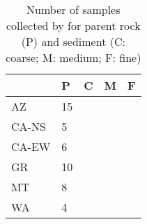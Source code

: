 \begin{table}[t]
    \centering
    \caption{Number of samples collected by \Textcite{Heins_1992} for parent rock (P) and sediment (C: coarse; M: medium; F: fine)}
    \label{tab:n_samples_Heins}
    \begin{threeparttable}
        \begin{tabular}{lllll}
            \toprule
                  & P  & C & M & F \\
            \midrule
            AZ    & 15 &   &   &   \\
            CA-NS & 5  &   &   &   \\
            CA-EW & 6  &   &   &   \\
            GR    & 10 &   &   &   \\
            MT    & 8  &   &   &   \\
            WA    & 4  &   &   &   \\
            \bottomrule
        \end{tabular}

    \end{threeparttable}
\end{table}

